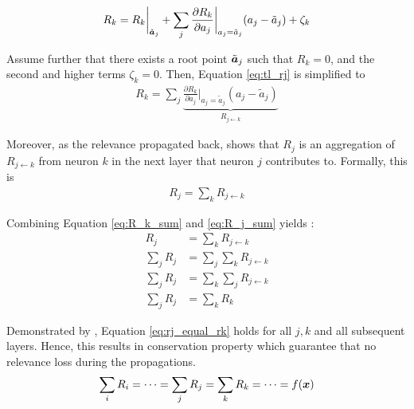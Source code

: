 

 \begin{align} \label{eq:tl_rj}
 R_k = R_k \bigg|_{ \tilde{\patvector{a}}_j } + \sum_{ j } 	\frac{\partial  R_k }{ \partial a_j } \bigg|_{ a_j = \tilde{a}_j } ( a_j - \tilde{a}_j ) + \zeta_k
 \end{align}

Assume further that there exists a root point $\tilde{\patvector{a}}_j$ such that $R_k = 0$, and the second and higher terms $\zeta_k = 0 $. Then, Equation \ref{eq:tl_rj} is simplified to
\begin{align} \label{eq:R_k_sum}
 R_k = \sum_{ j } \underbrace{	\frac{\partial  R_k }{ \partial a_j } \bigg|_{ a_j = \tilde{a}_j }  ( a_j - \tilde{a}_j ) }_{ R_{j \leftarrow k } }
\end{align}

Moreover, as the relevance propagated back, \cite{MontavonExplainingnonlinearclassification2017} shows that $R_j$ is an aggregation of $R_{j\leftarrow k}$ from neuron $k$ in the next layer that neuron $j$ contributes to. Formally, this is
\begin{align} \label{eq:R_j_sum}
	R_j = \sum_{k} R_{j\leftarrow k}
\end{align}

Combining Equation \ref{eq:R_k_sum} and \ref{eq:R_j_sum} yields :
\begin{align} \label{eq:rj_equal_rk}
	R_j &= \sum_{k} R_{j\leftarrow k} \nonumber \\
\sum_{j}	R_j &= \sum_{j} \sum_{k} R_{j\leftarrow k}\nonumber\\
\sum_{j}	R_j &= \sum_{k} \sum_{j} R_{j\leftarrow k} \nonumber\\
\sum_{j}	R_j &= \sum_{k}  R_{k}
\end{align}

Demonstrated by \cite{MontavonExplainingnonlinearclassification2017}, Equation \ref{eq:rj_equal_rk} holds for all $j, k$ and all subsequent layers. Hence, this results in  conservation property which guarantee that no relevance loss during the propagations.
\begin{align}
\sum_i 	R_{i} = 	\dots = \sum_j R_{j} = \sum_k R_{k} = \dots =  f(\patvector{x})
\end{align}
 
 

